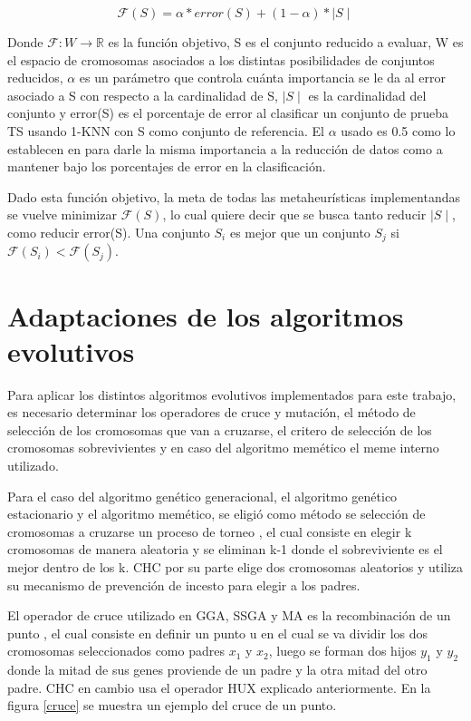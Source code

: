 \begin{equation}
\mathcal{F}(S) = \alpha * error(S) + (1 - \alpha) *  \mid S \mid
\end{equation} 

Donde $\mathcal{F}: W \rightarrow \mathbb{R}$ es la función objetivo, S es el conjunto reducido a evaluar, W es el espacio de cromosomas asociados a los distintas posibilidades de conjuntos reducidos, $\alpha$ es un parámetro que controla cuánta importancia se le da al error asociado a S con respecto a la cardinalidad de S, $\mid S \mid$ es la cardinalidad del conjunto y error(S) es el porcentaje de error al clasificar un conjunto de prueba TS usando 1-KNN con S como conjunto de referencia. El $\alpha$ usado es 0.5 como lo establecen en \cite{de2004reduccion} para darle la misma importancia a la reducción de datos como a mantener bajo los porcentajes de error en la clasificación.

Dado esta función objetivo, la meta de todas las metaheurísticas implementandas se vuelve minimizar $\mathcal{F}(S)$, lo cual quiere decir que se busca tanto reducir $\mid S \mid$, como reducir error(S). Una conjunto $S_i$ es mejor que un conjunto $S_j$ si $\mathcal{F}(S_i) < \mathcal{F}(S_j)$.  

\section{Adaptaciones de los algoritmos evolutivos}

Para aplicar los distintos algoritmos evolutivos implementados para este trabajo, es necesario determinar los operadores de cruce y mutación, el método de selección de los cromosomas que van a cruzarse, el critero de selección de los cromosomas sobrevivientes y en caso del algoritmo memético el meme interno utilizado.

Para el caso del algoritmo genético generacional, el algoritmo genético estacionario y el algoritmo memético, se eligió como método se selección de cromosomas a cruzarse un proceso de torneo \cite{talbi2009metaheuristics}, el cual consiste en elegir k cromosomas de manera aleatoria y se eliminan k-1 donde el sobreviviente es el mejor dentro de los k. CHC por su parte elige dos cromosomas aleatorios y utiliza su mecanismo de prevención de incesto para elegir a los padres. 

El operador de cruce utilizado en GGA, SSGA y MA es la recombinación de un punto \cite{talbi2009metaheuristics}, el cual consiste en definir un punto u en el cual se va dividir los dos cromosomas seleccionados como padres $x_1$ y $x_2$, luego se forman dos hijos $y_1$ y $y_2$ donde la mitad de sus genes proviende de un padre y la otra mitad del otro padre. CHC en cambio usa el operador HUX explicado anteriormente. En la figura \ref{cruce} se muestra un ejemplo del cruce de un punto. 

